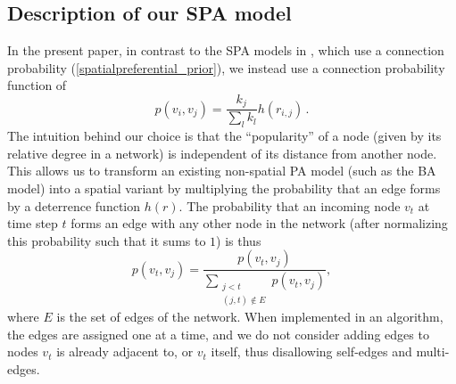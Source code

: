 \documentclass[%
 reprint,
 amsmath,amssymb,
 aps,
]{revtex4-1}
\begin{document}


\subsection{Description of our SPA model}

{\color{red}In the present paper, in contrast to the SPA models in \cite{SPA1,SPA2,SPA3}, which use a connection probability (\ref{spatialpreferential_prior}), we instead use a connection probability function of}
\begin{equation} \label{spatialpreferential}
    p(v_i,v_j) = \frac{k_j}{\sum_l k_l}h(r_{i,j})\,.
\end{equation}
The intuition behind our choice is that the ``popularity'' of a node (given by its relative degree in a network) is independent of its distance from another node. This allows us to transform an existing non-spatial PA model (such as the BA model) into a spatial variant by multiplying the probability that an edge forms by a deterrence function $h(r)$. {\color{red}The probability that an incoming node $v_t$ at time step $t$ forms an edge with any other node in the network (after normalizing this probability such that it sums to $1$) is thus
\begin{equation} \label{spatialpreferential_normalized}
p(v_t, v_j) = \frac{p(v_t, v_j)}{\sum\limits_{\substack{j < t \\ (j, t) \not\in E}} p(v_t, v_j)},
\end{equation}
where $E$ is the set of edges of the network. When implemented in an algorithm, the edges are assigned one at a time, and we do not consider adding edges to nodes $v_t$ is already adjacent to, or $v_t$ itself, thus disallowing self-edges and multi-edges.}
\end{document}

